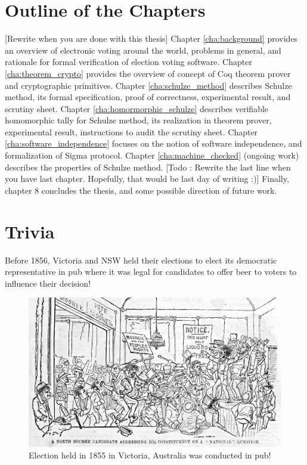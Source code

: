 \section{Outline of the Chapters}
[Rewrite when you are done with this thesis]
Chapter \ref{cha:background} provides an overview of electronic voting around the world, 
problems in general, and rationale for formal verification of election voting software. 
Chapter \ref{cha:theorem_crypto} provides the overview of concept of 
Coq theorem prover  and cryptographic primitives. Chapter \ref{cha:schulze_method} 
describes Schulze method, its formal specification, proof of correctness, experimental result, 
and scrutiny sheet.  
Chapter \ref{cha:homormorphic_schulze} describes 
verifiable homomorphic tally for Schulze method, its realization in theorem prover, experimental 
result,  instructions to audit the scrutiny sheet. 
Chapter \ref{cha:software_independence} focuses on the notion of software independence, and 
formalization of  
Sigma protocol. Chapter \ref{cha:machine_checked} (ongoing work) describes the 
properties of Schulze method. 
[Todo : Rewrite the last line when you have last chapter. Hopefully, that would be last 
day of writing :)]
Finally, chapter 8 concludes the thesis, and some possible direction of future work. 



\section{Trivia}
 Before 1856, Victoria and NSW held their elections to elect its 
	  democratic representative in pub where it was legal for 
	  candidates to offer beer to voters to influence their 
	  decision! 
	  
	   \begin{figure}[htb]
	\begin{center}
	\includegraphics[scale=0.25]{NorthBourke.jpg}
	\caption{Election held in 1855 in Victoria, Australia 
	  was conducted in pub!}
	\end{center}
  \end{figure}   
  
